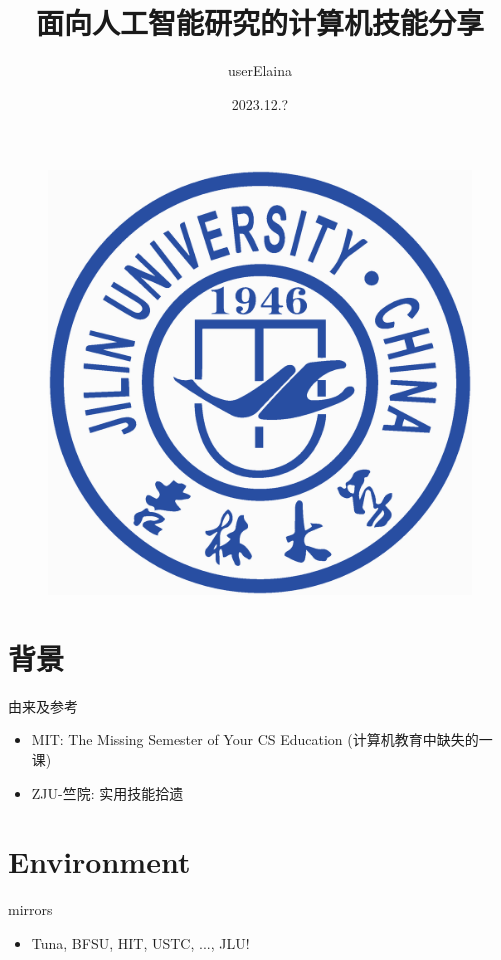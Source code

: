 \documentclass{beamer}
\author{userElaina}
\title{面向人工智能研究的计算机技能分享}
\institute{人工智能学院}
\date{2023.12.?}
\begin{document}
\kaishu
\begin{frame}
    \titlepage
    \begin{figure}[htpb]
        \begin{center}
            \includegraphics[width=0.15\linewidth]{pic/Jilin_University_Logo.eps}
        \end{center}
    \end{figure}
\end{frame}

\begin{frame}
\tableofcontents[sectionstyle=show,subsectionstyle=show/shaded/hide,subsubsectionstyle=show/shaded/hide]
\end{frame}

\section{背景}

\begin{frame}{由来及参考}
    \begin{itemize}
        \item MIT: The Missing Semester of Your CS Education (计算机教育中缺失的一课)
        \item ZJU-竺院: 实用技能拾遗
    \end{itemize}
\end{frame}

\section{Environment}

\begin{frame}{mirrors}
    \begin{itemize}
        \item Tuna, BFSU, HIT, USTC, ..., JLU!
    \end{itemize}
\end{frame}
\end{document}
